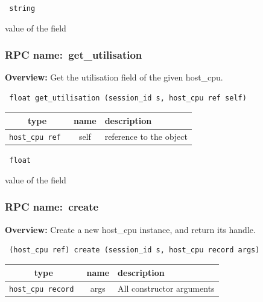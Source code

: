 \vspace{0.3cm}

{\tt 
string
}


value of the field
\vspace{0.3cm}
\vspace{0.3cm}
\vspace{0.3cm}
\subsubsection{RPC name:~get\_utilisation}

{\bf Overview:} 
Get the utilisation field of the given host\_cpu.

\begin{verbatim} float get_utilisation (session_id s, host_cpu ref self)\end{verbatim}



 
\vspace{0.3cm}
\begin{tabular}{|c|c|p{7cm}|}
 \hline
{\bf type} & {\bf name} & {\bf description} \\ \hline
{\tt host\_cpu ref } & self & reference to the object \\ \hline 

\end{tabular}

\vspace{0.3cm}

{\tt 
float
}


value of the field
\vspace{0.3cm}
\vspace{0.3cm}
\vspace{0.3cm}
\subsubsection{RPC name:~create}

{\bf Overview:} 
Create a new host\_cpu instance, and return its handle.

\begin{verbatim} (host_cpu ref) create (session_id s, host_cpu record args)\end{verbatim}



 
\vspace{0.3cm}
\begin{tabular}{|c|c|p{7cm}|}
 \hline
{\bf type} & {\bf name} & {\bf description} \\ \hline
{\tt host\_cpu record } & args & All constructor arguments \\ \hline 

\end{tabular}

